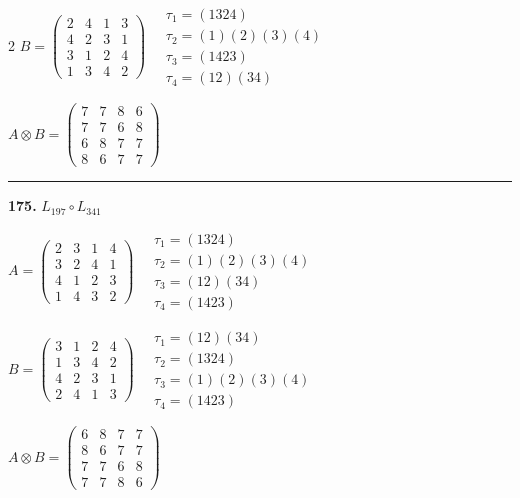 \begin{multicols}{2}
$B = \begin{pmatrix} 2 & 4 & 1 & 3 \\ 4 & 2 & 3 & 1 \\ 3 & 1 & 2 & 4 \\ 1 & 3 & 4 & 2 \end{pmatrix} \quad \begin{matrix} \tau_{1}=(1 3 2 4) \\ \tau_{2}=(1)(2)(3)(4) \\ \tau_{3}=(1 4 2 3) \\ \tau_{4}=(1 2)(3 4) \end{matrix}$

$A \otimes B = \begin{pmatrix} 7 & 7 & 8 & 6 \\ 7 & 7 & 6 & 8 \\ 6 & 8 & 7 & 7 \\ 8 & 6 & 7 & 7 \end{pmatrix}$

\vspace{0.3em}
\hrule
\vspace{0.3em}

\noindent\textbf{175.} $L_{197} \circ L_{341}$

$A = \begin{pmatrix} 2 & 3 & 1 & 4 \\ 3 & 2 & 4 & 1 \\ 4 & 1 & 2 & 3 \\ 1 & 4 & 3 & 2 \end{pmatrix} \quad \begin{matrix} \tau_{1}=(1 3 2 4) \\ \tau_{2}=(1)(2)(3)(4) \\ \tau_{3}=(1 2)(3 4) \\ \tau_{4}=(1 4 2 3) \end{matrix}$

$B = \begin{pmatrix} 3 & 1 & 2 & 4 \\ 1 & 3 & 4 & 2 \\ 4 & 2 & 3 & 1 \\ 2 & 4 & 1 & 3 \end{pmatrix} \quad \begin{matrix} \tau_{1}=(1 2)(3 4) \\ \tau_{2}=(1 3 2 4) \\ \tau_{3}=(1)(2)(3)(4) \\ \tau_{4}=(1 4 2 3) \end{matrix}$

$A \otimes B = \begin{pmatrix} 6 & 8 & 7 & 7 \\ 8 & 6 & 7 & 7 \\ 7 & 7 & 6 & 8 \\ 7 & 7 & 8 & 6 \end{pmatrix}$


\end{multicols}
